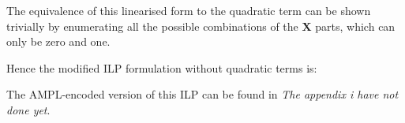 The equivalence of this linearised form to the quadratic term can be shown trivially by enumerating all the possible combinations of the $\mathbf{X}$ parts, which can only be zero and one.

Hence the modified ILP formulation without quadratic terms is:



The AMPL-encoded version of this ILP can be found in {\em The appendix i have not done yet}.%
